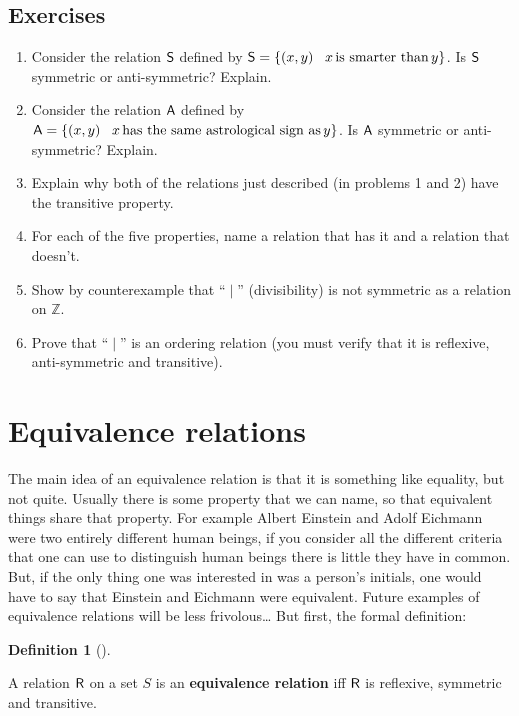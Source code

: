 \documentclass[10pt,]{book}
\newcommand{\terminology}[1]{\textbf{#1}}
\theoremstyle{plain}
\theoremstyle{definition}
\newtheorem{definition}[theorem]{Definition}
\theoremstyle{definition}
\numberwithin{equation}{section}
\newcommand{\suchthat}{\;  \;}
\newcommand{\divides}{\!\mid\!}
\newcommand{\Integers}{{\mathbb Z}}
\newcommand{\relR}{\mbox{\textsf R}}
\newcommand{\relS}{\mbox{\textsf S}}
\newcommand{\relA}{\mbox{\textsf A}}
\begin{document}
\subsection[{Exercises}]{Exercises}\label{exercises-31}
\leavevmode%
\begin{enumerate}[label=(\alph*)]
\item\hypertarget{li-404}{}
          Consider the relation \(\relS\) defined by 
          \(\relS = \{ (x,y) \suchthat \; x \, \mbox{is smarter than}  \, y \}\).
          Is \(\relS\) symmetric or anti-symmetric?  Explain.
\item\hypertarget{li-405}{}
          Consider the relation \(\relA\) defined by 
          \(\relA = \{ (x,y) \suchthat \; x \, \mbox{has the same astrological sign as}  \, y \}\).
          Is \(\relA\) symmetric or anti-symmetric?  Explain.
\item\hypertarget{li-406}{}
          Explain why both of the relations just described (in problems 1 and 2)
          have the transitive property.
\item\hypertarget{li-407}{}
          For each of the five properties, name a relation that has it
          and a relation that doesn't.
\item\hypertarget{li-408}{}
          Show by counterexample that ``\(\divides\)'' (divisibility) is not symmetric as a relation on \(\Integers\).
\item\hypertarget{li-409}{}
          Prove that ``\(\divides\)'' is an ordering relation (you must verify that it is reflexive, anti-symmetric and transitive).
\end{enumerate}
\typeout{************************************************}
\typeout{************************************************}
\section[{Equivalence relations}]{Equivalence relations}\label{sec_eq_rel}

    The main idea of an equivalence relation is that it is something like
    equality, but not quite. Usually there is some property that
    we can name, so that equivalent things share that property. For
    example Albert Einstein and Adolf Eichmann were two entirely
    different human beings, if you consider all the different criteria
    that one can use to distinguish human beings there is little they
    have in common. But, if the only thing one was interested in was
    a person's initials, one would have to say that Einstein and Eichmann
    were equivalent. Future examples of equivalence relations will
    be less frivolous\dots{} But first, the formal definition:
\begin{definition}[{}]\label{definition-9}

        A relation \(\relR\) on a set \(S\) is an \terminology{equivalence relation}
        iff \(\relR\) is reflexive, symmetric and transitive.
\end{definition}
\par
\end{document}
